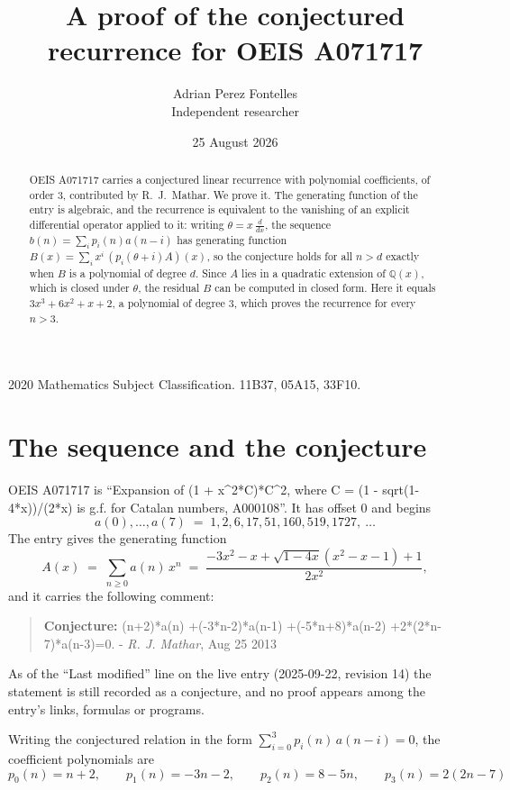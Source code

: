 \documentclass[11pt,a4paper]{article}
\title{A proof of the conjectured recurrence for OEIS A071717}
\author{Adrian Perez Fontelles\\ \small Independent researcher}
\date{25 August 2026}
\theoremstyle{plain}
\theoremstyle{definition}
\begin{document}
\maketitle

\begin{abstract}
OEIS A071717 carries a conjectured linear recurrence with polynomial coefficients, of
order 3, contributed by R.~J.~Mathar. We prove it. The generating function of the
entry is algebraic, and the recurrence is equivalent to the vanishing of an explicit
differential operator applied to it: writing $\theta=x\,\frac{d}{dx}$, the sequence
$b(n)=\sum_{i}p_{i}(n)a(n-i)$ has generating function
$B(x)=\sum_{i}x^{i}\,(p_{i}(\theta+i)A)(x)$, so the conjecture holds for all $n>d$ exactly
when $B$ is a polynomial of degree $d$. Since $A$ lies in a quadratic extension of
$\mathbb{Q}(x)$, which is closed under $\theta$, the residual $B$ can be computed in
closed form. Here it equals $3 x^{3} + 6 x^{2} + x + 2$, a polynomial of degree $3$, which proves
the recurrence for every $n>3$.
\end{abstract}

\noindent\small 2020 Mathematics Subject Classification. 11B37, 05A15, 33F10.\normalsize

\section{The sequence and the conjecture}

OEIS A071717 is ``Expansion of (1 + x\^{}2*C)*C\^{}2, where C = (1 - sqrt(1-4*x))/(2*x) is g.f. for Catalan numbers, A000108''. It has offset $0$ and begins
\[
a(0),\dots,a(7)\;=\;1, 2, 6, 17, 51, 160, 519, 1727,\ \dots
\]
The entry gives the generating function
\begin{equation}\label{eq:gf}
A(x)\;=\;\sum_{n\ge 0} a(n)\,x^{n}\;=\;\frac{- 3 x^{2} - x + \sqrt{1 - 4 x} \left(x^{2} - x - 1\right) + 1}{2 x^{2}} ,
\end{equation}
and it carries the following comment:
\begin{quote}\small
\textbf{Conjecture:} (n+2)*a(n) +(-3*n-2)*a(n-1) +(-5*n+8)*a(n-2) +2*(2*n-7)*a(n-3)=0. - \emph{R. J. Mathar}, Aug 25 2013
\end{quote}
As of the ``Last modified'' line on the live entry (2025-09-22, revision 14) the
statement is still recorded as a conjecture, and no proof appears among the entry's links,
formulas or programs.

Writing the conjectured relation in the form $\sum_{i=0}^{3}p_{i}(n)\,a(n-i)=0$,
the coefficient polynomials are
\[
p_{0}(n)=n + 2,\qquad p_{1}(n)=- 3 n - 2,\qquad p_{2}(n)=8 - 5 n,\qquad p_{3}(n)=2 \left(2 n - 7\right)
\]
\end{document}

